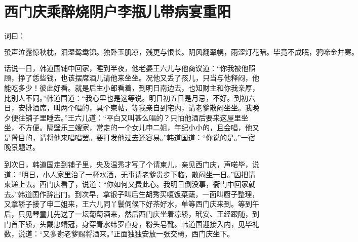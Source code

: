 

\chapter{西门庆乘醉烧阴户\KG 李瓶儿带病宴重阳}


词曰：

\[
蛩声泣露惊秋枕，泪湿鸳鸯锦。独卧玉肌凉，残更与恨长。　
阴风翻翠幌，雨涩灯花暗。毕竟不成眠，鸦啼金井寒。
\]

话说一日，韩道国铺中回家，睡到半夜，他老婆王六儿与他商议道：“你我被他照顾，挣了恁些钱，也该摆席酒儿请他来坐坐。况他又丢了孩儿，只当与他释闷，他能吃多少！彼此好看。就是后生小郎看着，到明日南边去，也知财主和你我亲厚，比别人不同。”韩道国道：“我心里也是这等说。明日初五日是月忌，不好。到初六日，安排酒席，叫两个唱的，具个柬帖，等我亲自到宅内，请老爹散闷坐坐。我晚夕便往铺子里睡去。”王六儿道：“平白又叫甚么唱的？只怕他酒后要来这屋里坐坐，不方便。隔壁乐三嫂家，常走的一个女儿申二姐，年纪小小的，且会唱，他又是瞽目的，请将他来唱唱罢。要打发他过去还容易。”韩道国道：“你说的是。”一宿晚景题过。

到次日，韩道国走到铺子里，央及温秀才写了个请柬儿，亲见西门庆，声喏毕，说道：“明日，小人家里治了一杯水酒，无事请老爹贵步下临，散闷坐一日。”因把请柬递上去。西门庆看了，说道：“你如何又费此心。我明日倒没事，衙门中回家就去。”韩道国作辞出门。到次早，拿银子叫后生胡秀买嗄饭菜蔬，一面叫厨子整理，又拿轿子接了申二姐来，王六儿同丫鬟伺候下好茶好水，单等西门庆来到。等到午后，只见琴童儿先送了一坛葡萄酒来，然后西门庆坐着凉轿，玳安、王经跟随，到门首下轿，头戴忠靖冠，身穿青水纬罗直身，粉头皂靴。韩道国迎接入内，见毕礼数，说道：“又多谢老爹赐将酒来。”正面独独安放一张交椅，西门庆坐下。

